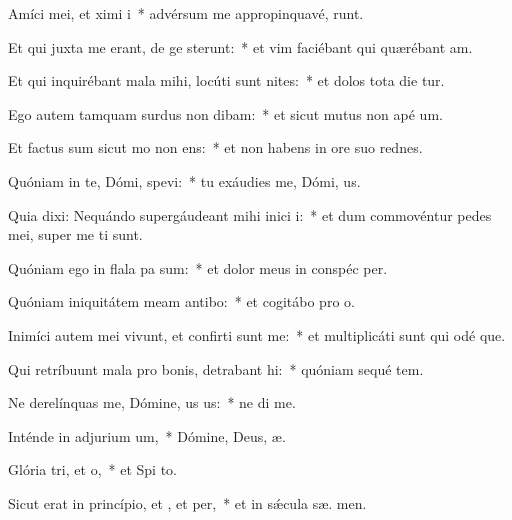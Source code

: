 \item Amíci mei, et ximi i~* advérsum me appropinquavé,  runt.
\item Et qui juxta me erant, de ge sterunt:~* et vim faciébant qui quærébant  am.
\item Et qui inquirébant mala mihi, locúti sunt nites:~* et dolos tota die tur.
\item Ego autem tamquam surdus non dibam:~* et sicut mutus non apé  um.
\item Et factus sum sicut mo non ens:~* et non habens in ore suo rednes.
\item Quóniam in te, Dómi, spevi:~* tu exáudies me, Dómi,  us.
\item Quia dixi: Nequándo supergáudeant mihi inici i:~* et dum commovéntur pedes mei, super me  ti sunt.
\item Quóniam ego in flala pa sum:~* et dolor meus in conspéc  per.
\item Quóniam iniquitátem meam antibo:~* et cogitábo pro  o.
\item Inimíci autem mei vivunt, et confirti sunt  me:~* et multiplicáti sunt qui odé  que.
\item Qui retríbuunt mala pro bonis, detrabant hi:~* quóniam sequé tem.
\item Ne derelínquas me, Dómine, us us:~* ne di  me.
\item Inténde in adjurium um,~* Dómine, Deus,  æ.
\item Glória tri, et o,~* et Spi to.
\item Sicut erat in princípio, et , et per,~* et in sǽcula sæ. men.
